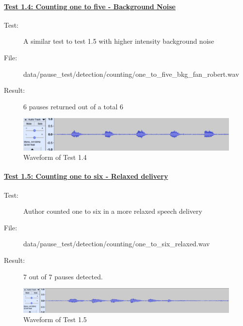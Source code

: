 \paragraph{\underline{Test 1.4: Counting one to five - Background Noise}}
\begin{description}
	\item[Test:] A similar test to test 1.5 with higher intensity background noise 
	\item[File:] data/pause\_test/detection/counting/one\_to\_five\_bkg\_fan\_robert.wav
	\item[Result:] 6 pauses returned out of a total 6
\end{description}
\begin{figure}[h]
	\center
	\includegraphics[scale=0.2]{src/main-matter/results/preliminary-testing/detection/016}
	\caption{Waveform of Test 1.4}
	\label{fig:016}
\end{figure}

\paragraph{\underline{Test 1.5: Counting one to six - Relaxed delivery}}
\begin{description}
	\item[Test:] Author counted one to six in a more relaxed speech delivery 
	\item[File:] data/pause\_test/detection/counting/one\_to\_six\_relaxed.wav
	\item[Result:] 7 out of 7 pauses detected. %
\end{description}
\begin{figure}[h]
	\center
	\includegraphics[scale=0.2]{src/main-matter/results/preliminary-testing/detection/017}
	\caption{Waveform of Test 1.5}
	\label{fig:017}
\end{figure}


